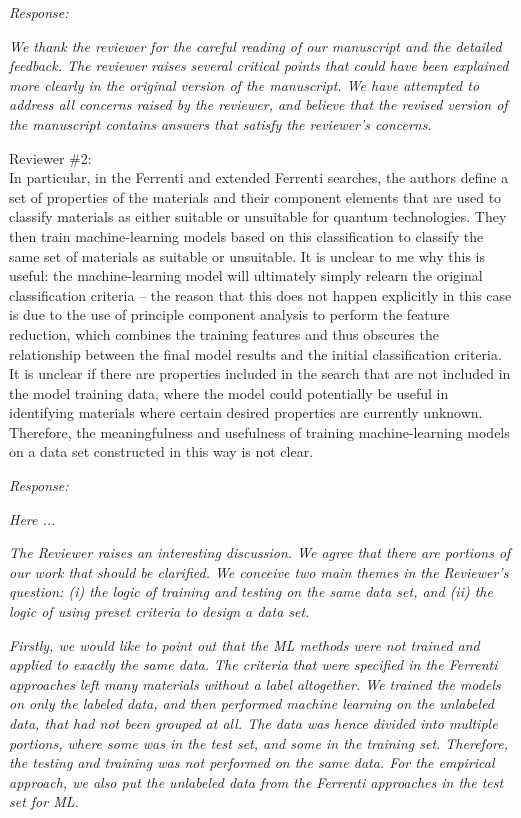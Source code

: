 \documentclass[11pt, a4paper]{letter} %
\begin{document}
\textit{Response:}  

\textit{We thank the reviewer for the careful reading of our manuscript and the detailed feedback. The reviewer raises several critical points that could have been explained more clearly in the original version of the manuscript. We have attempted to address all concerns raised by the reviewer, and believe that the revised version of the manuscript contains answers that satisfy the reviewer’s concerns. } 

Reviewer \#2: \\
In particular, in the Ferrenti and extended Ferrenti searches, the authors define a set of properties of the materials and their component elements that are used to classify materials as either suitable or unsuitable for quantum technologies. They then train machine-learning models based on this classification to classify the same set of materials as suitable or unsuitable. It is unclear to me why this is useful: the machine-learning model will ultimately simply relearn the original classification criteria – the reason that this does not happen explicitly in this case is due to the use of principle component analysis to perform the feature reduction, which combines the training features and thus obscures the relationship between the final model results and the initial classification criteria. It is unclear if there are properties included in the search that are not included in the model training data, where the model could potentially be useful in identifying materials
where certain desired properties are currently unknown. Therefore, the meaningfulness and usefulness of training machine-learning models on a data set constructed in this way is not clear.

\textit{Response:} 

\textit{Here ... }

\textit{The Reviewer raises an interesting discussion. We agree that there are portions of our work that should be clarified. We conceive two main themes in the Reviewer's question: (i) the logic of training and testing on the same data set, and (ii) the logic of using preset criteria to design a data set.} 

\textit{Firstly, we would like to point out that the ML methods were not trained and applied to exactly the same data. The criteria that were specified in the Ferrenti approaches left many materials without a label altogether. We trained the models on only the labeled data, and then performed machine learning on the unlabeled data, that had not been grouped at all. The data was hence divided into multiple portions, where some was in the test set, and some in the  training set. Therefore, the testing and training was not performed on the same data. For the empirical approach, we also put the unlabeled data from the Ferrenti approaches in the test set for ML.}
\end{document}
